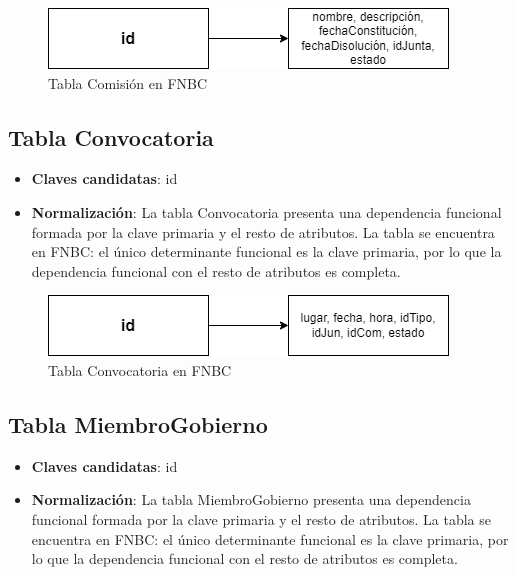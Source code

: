 \begin{figure}[H]
\centering
\includegraphics[scale=0.75]{img/diagramas/Datos/FNBC-Comisión.png}
\caption{Tabla Comisión en FNBC}\label{fig:Tabla Comisión en FNBC}   
\end{figure}

\subsection{Tabla Convocatoria}
    \begin{itemize}
        \item \textbf{Claves candidatas}: id
        \item \textbf{Normalización}: La tabla Convocatoria presenta una dependencia funcional formada por la clave primaria y el resto de atributos. La tabla se encuentra en FNBC: el único determinante funcional es la clave primaria, por lo que la dependencia funcional con el resto de atributos es completa.
    \end{itemize}

\begin{figure}[H]
\centering
\includegraphics[scale=0.75]{img/diagramas/Datos/FNBC-Convocatoria.png}
\caption{Tabla Convocatoria en FNBC}\label{fig:Tabla Convocatoria en FNBC}   
\end{figure}

\subsection{Tabla MiembroGobierno}
    \begin{itemize}
        \item \textbf{Claves candidatas}: id
        \item \textbf{Normalización}: La tabla MiembroGobierno presenta una dependencia funcional formada por la clave primaria y el resto de atributos. La tabla se encuentra en FNBC: el único determinante funcional es la clave primaria, por lo que la dependencia funcional con el resto de atributos es completa.
    \end{itemize}

